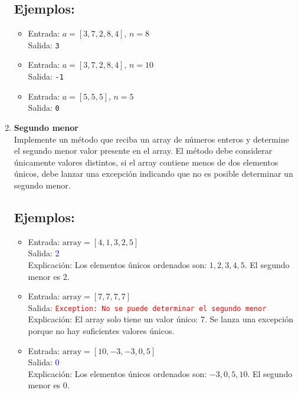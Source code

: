 \begin{enumerate}
     \subsection*{Ejemplos:}
     \begin{itemize}
        \item Entrada: \( a = [3, 7, 2, 8, 4], \, n = 8 \)\\
        Salida: \texttt{3}
        
        \item Entrada: \( a = [3, 7, 2, 8, 4], \, n = 10 \)\\
        Salida: \texttt{-1}
        
        \item Entrada: \( a = [5, 5, 5], \, n = 5 \)\\
        Salida: \texttt{0}
    \end{itemize}
     
    \item \textbf{Segundo menor}\\
    Implemente un método que reciba un array de números enteros y determine el segundo menor valor presente en el array. El método debe considerar únicamente valores distintos, si el array contiene menos de dos elementos únicos, debe lanzar una excepción indicando que no es posible determinar un segundo menor.
    \subsection*{Ejemplos:}
    \begin{itemize}
        \item Entrada: \( \text{array} = [4, 1, 3, 2, 5] \)\\
        Salida: \textcolor{blue}{2}\\
        Explicación: Los elementos únicos ordenados son: \(1, 2, 3, 4, 5\).
        El segundo menor es \( 2 \).
    
        \item Entrada: \( \text{array} = [7, 7, 7, 7] \)\\
        Salida: \textcolor{red}{\texttt{Exception: No se puede determinar el segundo menor}}\\
        Explicación: El array solo tiene un valor único: \(7\).
        Se lanza una excepción porque no hay suficientes valores únicos.
    
        \item Entrada: \( \text{array} = [10, -3, -3, 0, 5] \)\\
        Salida: \textcolor{blue}{0}\\
        Explicación: Los elementos únicos ordenados son: \(-3, 0, 5, 10\).
        El segundo menor es \( 0 \).
    

\end{itemize}
\end{enumerate}
